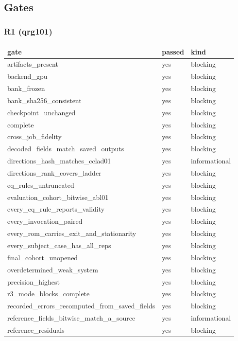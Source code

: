 \documentclass[11pt]{article}
\begin{document}
\subsection{Gates}
\subsubsection{R1 (qrg101)}
\begin{table}[htbp]\centering\small
\begin{tabular}{lll}\hline
gate & passed & kind \\ \hline
artifacts\_present & yes & blocking \\
backend\_gpu & yes & blocking \\
bank\_frozen & yes & blocking \\
bank\_sha256\_consistent & yes & blocking \\
checkpoint\_unchanged & yes & blocking \\
complete & yes & blocking \\
cross\_job\_fidelity & yes & blocking \\
decoded\_fields\_match\_saved\_outputs & yes & blocking \\
directions\_hash\_matches\_cclad01 & yes & informational \\
directions\_rank\_covers\_ladder & yes & blocking \\
eq\_rules\_untruncated & yes & blocking \\
evaluation\_cohort\_bitwise\_abl01 & yes & blocking \\
every\_eq\_rule\_reports\_validity & yes & blocking \\
every\_invocation\_paired & yes & blocking \\
every\_rom\_carries\_exit\_and\_stationarity & yes & blocking \\
every\_subject\_case\_has\_all\_reps & yes & blocking \\
final\_cohort\_unopened & yes & blocking \\
overdetermined\_weak\_system & yes & blocking \\
precision\_highest & yes & blocking \\
r3\_mode\_blocks\_complete & yes & blocking \\
recorded\_errors\_recomputed\_from\_saved\_fields & yes & blocking \\
reference\_fields\_bitwise\_match\_a\_source & yes & informational \\
reference\_residuals & yes & blocking \\

\end{tabular}
\end{table}
\end{document}
